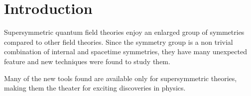 \begin{comment}
	---- OUTLINE-----
	***Supersimmetria:
		~ + simmetria = + strumenti per studiare teorie
		~Non renormalization theorems (perturbative)
		~ milder divergence 
		~exact results (e.g. superpotential, witten index , exact beta function )
		~Holomorphicity, couplings as background fields (important is smoothness of weak coupling limits, e.g. classic limit g in 0 well defined.
		Use of wilsonian action: no IR divergences)
		~moduli spaces
		--Superconformal group-- more relations, r charge, dimensions ecc
		~brane constructions?
		~Superconformal index
		~Localizations

\end{comment}

\section{Introduction}
Supersymmetric quantum field theories enjoy an enlarged group of  symmetries compared to other field theories. 
Since the symmetry group is a non trivial combination of internal and spacetime symmetries, they have many unexpected feature and new techniques were found to study them.

Many of the new tools found are available only for supersymmetric theories, making them the theater for exciting discoveries in physics.